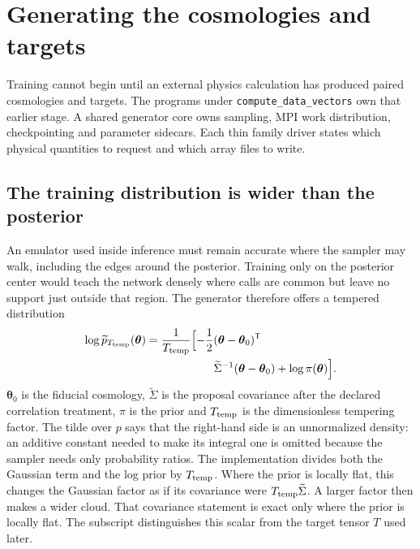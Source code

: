 \documentclass[10pt,aps,prd,twocolumn,nofootinbib]{revtex4-2}
\newcommand{\code}[1]{\texttt{#1}}
\newcommand{\btheta}{\boldsymbol{\theta}}
\begin{document}
\section{Generating the cosmologies and targets}
\label{sec:generation}

Training cannot begin until an external physics calculation has produced
paired cosmologies and targets.  The programs under
\code{compute\_data\_vectors} own that earlier stage.  A shared generator core
owns sampling, MPI work distribution, checkpointing and parameter sidecars.
Each thin family driver states which physical quantities to request and which
array files to write.

\subsection{The training distribution is wider than the posterior}

An emulator used inside inference must remain accurate where the sampler may
walk, including the edges around the posterior.  Training only on the
posterior center would teach the network densely where calls are common but
leave no support just outside that region.  The generator therefore offers a
tempered distribution
\begin{equation}
\begin{aligned}
\log \widetilde p_{T_{\rm temp}}(\btheta)
&=\frac{1}{T_{\rm temp}}
  \Bigl[-\frac12(\btheta-\btheta_0)^{\mathsf T} \\
&\hspace{2.1cm}\widetilde\Sigma^{-1}(\btheta-\btheta_0)
  +\log\pi(\btheta)\Bigr].
\end{aligned}
\label{eq:tempered}
\end{equation}
\(\btheta_0\) is the fiducial cosmology, \(\widetilde\Sigma\) is the proposal
covariance after the declared correlation treatment, \(\pi\) is the prior
and \(T_{\rm temp}\) is the dimensionless tempering factor.  The tilde over
\(p\) says that the right-hand side is an unnormalized density: an additive
constant needed to make its integral one is omitted because the sampler needs
only probability ratios.  The implementation divides both the Gaussian term
and the log prior by \(T_{\rm temp}\).  Where the prior is locally flat, this
changes the Gaussian factor as if its covariance were
\(T_{\rm temp}\widetilde\Sigma\).  A larger factor then makes a wider cloud.
That covariance statement is exact only where the prior is locally flat.
The subscript distinguishes this scalar from the target tensor $T$ used later.
\end{document}

